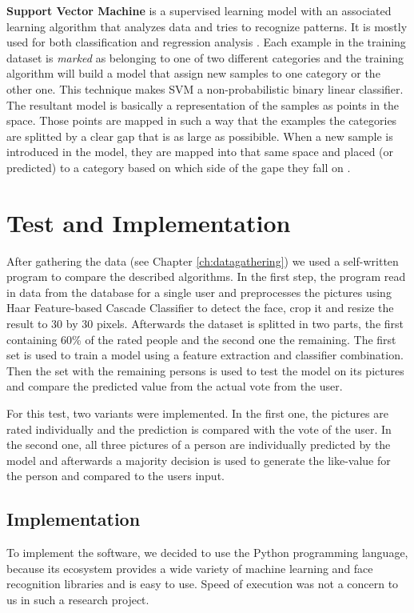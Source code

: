 \documentclass{report}
\begin{document}
\textbf{Support Vector Machine} is a supervised learning model with an associated learning algorithm that analyzes data and tries to recognize patterns. It is mostly used for both classification and regression analysis \cite{svm-wiki}.
Each example in the training dataset is \textit{marked} as belonging to one of two different categories and the training algorithm will build a model that assign new samples to one category or the other one.
This technique makes SVM a non-probabilistic binary linear classifier.
The resultant model is basically a representation of the samples as points in the space. Those points are mapped in such a way that the examples the categories are splitted by a clear gap that is as large as possibible. When a new sample is introduced in the model, they are mapped into that same space and placed (or predicted) to a category based on which side of the gape they fall on \cite{svm-wiki}.

\chapter{Test and Implementation}
\label{ch:test}
After gathering the data (see Chapter \ref{ch:datagathering}) we used a self-written program to compare the described algorithms.
In the first step, the program read in data from the database for a single user and preprocesses the pictures using Haar Feature-based Cascade Classifier to detect the face, crop it and resize the result to 30 by 30 pixels.
Afterwards the dataset is splitted in two parts, the first containing 60\% of the rated people and the second one the remaining.
The first set is used to train a model using a feature extraction and classifier combination.
Then the set with the remaining persons is used to test the model on its pictures and compare the predicted value from the actual vote from the user.

For this test, two variants were implemented.
In the first one, the pictures are rated individually and the prediction is compared with the vote of the user.
In the second one, all three pictures of a person are individually predicted by the model and afterwards a majority decision is used to generate the like-value for the person and compared to the users input.

\section{Implementation}

To implement the software, we decided to use the Python programming language, because its ecosystem provides a wide variety of machine learning and face recognition libraries and is easy to use.
Speed of execution was not a concern to us in such a research project.
\end{document}
